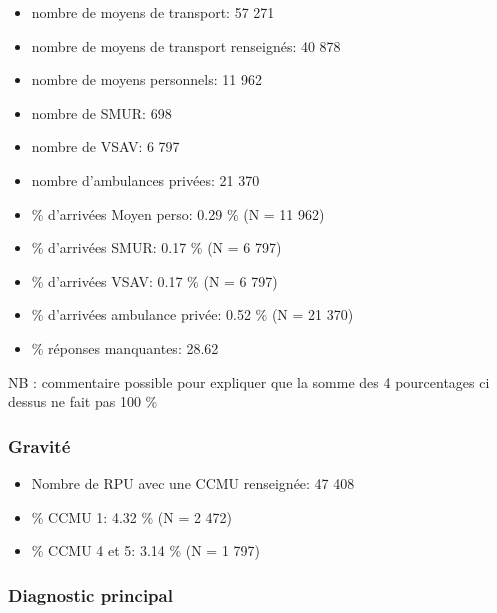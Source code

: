 \documentclass[]{article}
\begin{document}
\begin{itemize}
\item
  nombre de moyens de transport: 57 271
\item
  nombre de moyens de transport renseignés: 40 878
\item
  nombre de moyens personnels: 11 962
\item
  nombre de SMUR: 698
\item
  nombre de VSAV: 6 797
\item
  nombre d'ambulances privées: 21 370
\item
  \% d'arrivées Moyen perso: 0.29 \% (N = 11 962)
\item
  \% d'arrivées SMUR: 0.17 \% (N = 6 797)
\item
  \% d'arrivées VSAV: 0.17 \% (N = 6 797)
\item
  \% d'arrivées ambulance privée: 0.52 \% (N = 21 370)
\item
  \% réponses manquantes: 28.62
\end{itemize}

NB : commentaire possible pour expliquer que la somme des 4 pourcentages
ci dessus ne fait pas 100 \%

\subsubsection{Gravité}\label{gravite}

\begin{itemize}
\itemsep1pt\parskip0pt
\item
  Nombre de RPU avec une CCMU renseignée: 47 408
\item
  \% CCMU 1: 4.32 \% (N = 2 472)
\item
  \% CCMU 4 et 5: 3.14 \% (N = 1 797)
\end{itemize}

\subsubsection{Diagnostic principal}\label{diagnostic-principal-1}
\end{document}
